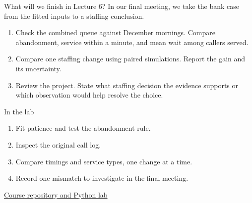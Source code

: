 \documentclass{beamer}
\begin{document}
\begin{frame}{What will we finish in Lecture 6?}
  In our final meeting, we take the bank case from the fitted inputs
  to a staffing conclusion.

  \begin{enumerate}
    \item Check the combined queue against December mornings. Compare
      abandonment, service within a minute, and mean wait among callers served.
    \item Compare one staffing change using paired simulations. Report
      the gain and its uncertainty.
    \item Review the project. State what staffing decision the evidence
      supports or which observation would help resolve the choice.
  \end{enumerate}
\end{frame}

\begin{frame}{In the lab}
  \begin{enumerate}
    \item Fit patience and test the abandonment rule.
    \item Inspect the original call log.
    \item Compare timings and service types, one change at a time.
    \item Record one mismatch to investigate in the final meeting.
  \end{enumerate}

  \vspace{0.6em}
  \href{https://github.com/NaitsabesMue/stochastic-modeling-simulation-ds}{Course repository and Python lab}
\end{frame}
\end{document}
